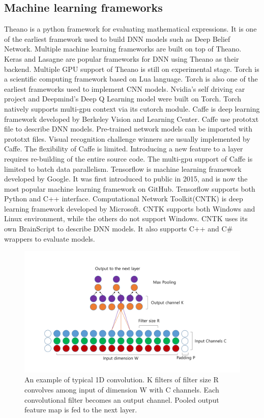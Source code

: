 \documentclass[conference]{IEEEtran}
\begin{document}
\subsection{Machine learning frameworks}

Theano is a python framework for evaluating mathematical expressions. 
\cite{DBLP:journals/corr/Al-RfouAAa16}
It is one of the earliest framework used to build DNN models such as Deep Belief Network.
Multiple machine learning frameworks are built on top of Theano.
Keras and Lasagne are popular frameworks for DNN using Theano as their backend.
Multiple GPU support of Theano is still on experimental stage.
Torch is a scientific computing framework based on Lua language.
\cite{torch}
Torch is also one of the earliest frameworks used to implement CNN models.
Nvidia's self driving car project and Deepmind's Deep Q Learning model were built on Torch.
\cite{nvdave, mnih2015humanlevel}
Torch natively supports multi-gpu context via its cutorch module.
Caffe is deep learning framework developed by Berkeley Vision and Learning Center.
\cite{jia2014caffe}
Caffe use prototxt file to describe DNN models.
Pre-trained network models can be imported with prototxt files.
Visual recognition challenge winners are usually implemented by Caffe.
\cite{ILSVRC15, RCNN, vgg}
The flexibility of Caffe is limited.
Introducing a new feature to a layer requires re-building of the entire source code.
The multi-gpu support of Caffe is limited to batch data parallelism.
Tensorflow is machine learning framework developed by Google.
\cite{tensorflow2015-whitepaper}
It was first introduced to public in 2015, and is now the most popular machine learning framework on GitHub.
Tensorflow supports both Python and C++ interface.
Computational Network Toolkit(CNTK) is deep learning framework developed by Microsoft.
\cite{cntk}
CNTK supports both Windows and Linux environment, while the others do not support Windows.
CNTK uses its own BrainScript to describe DNN models.
It also supports C++ and C\# wrappers to evaluate models.

\begin{figure}
  \centering
  \includegraphics[width=\linewidth]{./figures/convlayer}
  \caption{An example of typical 1D convolution. K filters of filter size R convolves among input of dimension W with C channels.
	Each convolutional filter becomes an output channel. Pooled output feature map is fed to the next layer. }
  \label{fig_convlayer}
\end{figure}
\end{document}
